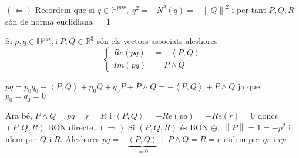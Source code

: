 \documentclass[../main.tex]{subfiles}
\begin{document}
	\begin{demostracio}
		$\left(\Leftarrow\right)$ Recordem que si $q \in \mathbb{H}^{pur},\; q^2 = -N^2(q) = -\left\lVert Q \right\rVert^2$ i per tant $P,Q,R$ són de norma euclidiana $=1$
		\begin{lema}
			Si $p,q \in \mathbb{H}^{pur},\text{i}\; P,Q \in \mathbb{R}^3$ són els vectors associats aleshores
			\begin{displaymath}
				\begin{cases}
					Re\left(pq\right) &= -\left\langle P, Q \right\rangle\\
					Im\left(pq\right) &= P\wedge Q
				\end{cases}
			\end{displaymath}
		\end{lema}
		\begin{demostracio}
			$pq = p_0q_0 - \left\langle P, Q \right\rangle +p_0Q+q_0P + P\wedge Q = -\left\langle P, Q \right\rangle + P\wedge Q$ ja que $p_0 = q_0 = 0$
		\end{demostracio}
		Ara bé, $P\wedge Q = pq = r = R$ i $\left\langle P, Q \right\rangle = -Re(pq) = -Re(r) = 0$ doncs $\left(P,Q,R\right)$ BON directe.
		$\left(\Rightarrow\right)$ Si $\left(P,Q,R\right)$ és BON $\oplus,\; \left\lVert P \right\rVert = 1 = -p^2$ i idem per $Q$ i $R$. Aleshores $pq = - \underbrace{\left\langle P, Q \right\rangle}_{=0} + P\wedge Q = R = r$ i idem per $qr$ i $rp$.
	\end{demostracio}
\end{document}
